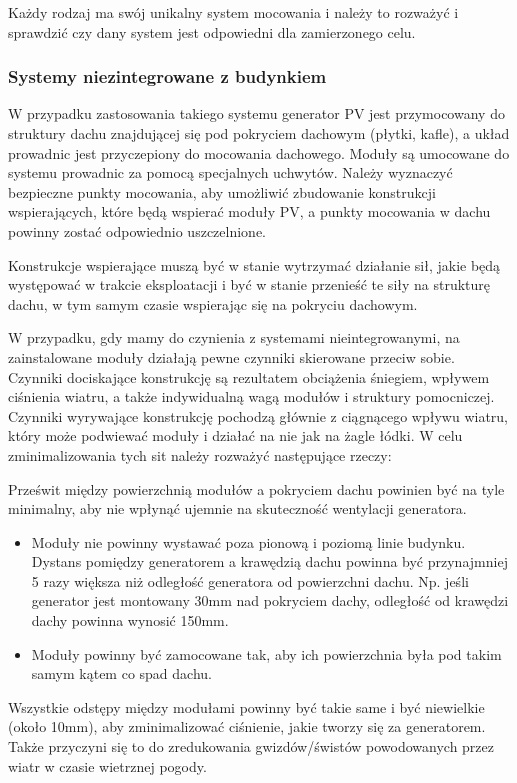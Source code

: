 \documentclass[12pt,a4paper]{article}
\begin{document}
Każdy rodzaj ma swój unikalny system mocowania i należy to rozważyć i 
sprawdzić czy dany system jest odpowiedni dla zamierzonego celu. 

 

\subsubsection{Systemy niezintegrowane z budynkiem}


W przypadku zastosowania takiego systemu generator PV jest przymocowany 
do struktury dachu znajdującej się pod pokryciem dachowym (płytki, 
kafle), a układ prowadnic jest przyczepiony do mocowania dachowego. 
Moduły są umocowane do systemu prowadnic za pomocą specjalnych uchwytów. 
Należy wyznaczyć bezpieczne punkty mocowania, aby umożliwić zbudowanie 
konstrukcji wspierających, które będą wspierać moduły PV, a punkty 
mocowania w dachu powinny zostać odpowiednio uszczelnione. 

 

Konstrukcje wspierające muszą być w stanie wytrzymać działanie sił, 
jakie będą występować w trakcie eksploatacji i być w stanie przenieść te 
siły na strukturę dachu, w tym samym czasie wspierając się na pokryciu 
dachowym. 

 

W przypadku, gdy mamy do czynienia z systemami nieintegrowanymi, na 
zainstalowane moduły działają pewne czynniki skierowane przeciw sobie. 
Czynniki dociskające konstrukcję są rezultatem obciążenia śniegiem, 
wpływem ciśnienia wiatru, a także indywidualną wagą modułów i struktury 
pomocniczej. Czynniki wyrywające konstrukcję pochodzą głównie z 
ciągnącego wpływu wiatru, który może podwiewać moduły i działać na nie 
jak na żagle łódki. W celu zminimalizowania tych sit należy rozważyć 
następujące rzeczy: 

 

Prześwit między powierzchnią modułów a pokryciem dachu powinien być na 
tyle minimalny, aby nie wpłynąć ujemnie na skuteczność wentylacji 
generatora. 

\begin{itemize}
\item Moduły nie powinny wystawać poza pionową i poziomą linie budynku. 
Dystans pomiędzy generatorem a krawędzią dachu powinna być przynajmniej 
5 razy większa niż odległość generatora od powierzchni dachu. Np. jeśli 
generator jest montowany 30mm nad pokryciem dachy, odległość od krawędzi 
dachy powinna wynosić 150mm. 
\item Moduły powinny być zamocowane tak, aby ich powierzchnia była pod 
takim samym kątem co spad dachu. 
\end{itemize}
Wszystkie odstępy między modułami powinny być takie same i być 
niewielkie (około 10mm), aby zminimalizować ciśnienie, jakie tworzy się 
za generatorem. Także przyczyni się to do zredukowania gwizdów/świstów 
powodowanych przez wiatr w czasie wietrznej pogody. 
\end{document}
